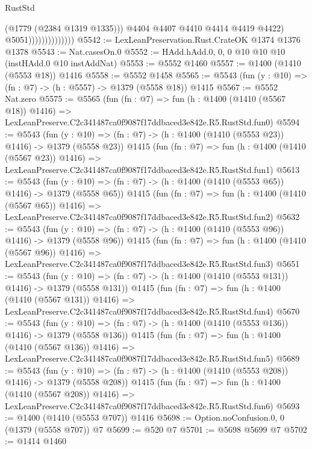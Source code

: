 \begin{lexlean}{RustStd}
\begin{coremodule}
                                    (@1779 (@2384 @1319 @1335)))
                                  @4404
                                  @4407
                                  @4410
                                  @4414
                                  @4419
                                  @4422)
                                @5051))))))))))))))
@5542 := LexLeanPreservation.Rust.CrateOK @1374 @1376 @1378
@5543 := Nat.casesOn.{0}
@5552 := HAdd.hAdd.{0, 0, 0} @10 @10 @10 (instHAdd.{0} @10 instAddNat)
@5553 := @5552 @1460
@5557 := @1400 (@1410 (@5553 @18)) @1416
@5558 := @5552 @1458
@5565 := @5543 (fun (y : @10) => (fn : @7) -> (h : @5557) -> @1379 (@5558 @18)) @1415
@5567 := @5552 Nat.zero
@5575 := @5565
    (fun (fn : @7) =>
    fun (h : @1400 (@1410 (@5567 @18)) @1416) =>
    LexLeanPreserve.C2c341487ca0f9087f17ddbaced3e842e.R5.RustStd.fun0)
@5594 := @5543
    (fun (y : @10) => (fn : @7) -> (h : @1400 (@1410 (@5553 @23)) @1416) -> @1379 (@5558 @23))
    @1415
    (fun (fn : @7) =>
    fun (h : @1400 (@1410 (@5567 @23)) @1416) =>
    LexLeanPreserve.C2c341487ca0f9087f17ddbaced3e842e.R5.RustStd.fun1)
@5613 := @5543
    (fun (y : @10) => (fn : @7) -> (h : @1400 (@1410 (@5553 @65)) @1416) -> @1379 (@5558 @65))
    @1415
    (fun (fn : @7) =>
    fun (h : @1400 (@1410 (@5567 @65)) @1416) =>
    LexLeanPreserve.C2c341487ca0f9087f17ddbaced3e842e.R5.RustStd.fun2)
@5632 := @5543
    (fun (y : @10) => (fn : @7) -> (h : @1400 (@1410 (@5553 @96)) @1416) -> @1379 (@5558 @96))
    @1415
    (fun (fn : @7) =>
    fun (h : @1400 (@1410 (@5567 @96)) @1416) =>
    LexLeanPreserve.C2c341487ca0f9087f17ddbaced3e842e.R5.RustStd.fun3)
@5651 := @5543
    (fun (y : @10) => (fn : @7) -> (h : @1400 (@1410 (@5553 @131)) @1416) -> @1379 (@5558 @131))
    @1415
    (fun (fn : @7) =>
    fun (h : @1400 (@1410 (@5567 @131)) @1416) =>
    LexLeanPreserve.C2c341487ca0f9087f17ddbaced3e842e.R5.RustStd.fun4)
@5670 := @5543
    (fun (y : @10) => (fn : @7) -> (h : @1400 (@1410 (@5553 @136)) @1416) -> @1379 (@5558 @136))
    @1415
    (fun (fn : @7) =>
    fun (h : @1400 (@1410 (@5567 @136)) @1416) =>
    LexLeanPreserve.C2c341487ca0f9087f17ddbaced3e842e.R5.RustStd.fun5)
@5689 := @5543
    (fun (y : @10) => (fn : @7) -> (h : @1400 (@1410 (@5553 @208)) @1416) -> @1379 (@5558 @208))
    @1415
    (fun (fn : @7) =>
    fun (h : @1400 (@1410 (@5567 @208)) @1416) =>
    LexLeanPreserve.C2c341487ca0f9087f17ddbaced3e842e.R5.RustStd.fun6)
@5693 := @1400 (@1410 (@5553 @707)) @1416
@5698 := Option.noConfusion.{0, 0} (@1379 (@5558 @707)) @7
@5699 := @520 @7
@5701 := @5698 @5699 @7
@5702 := @1414 @1460

\end{coremodule}
\end{lexlean}
